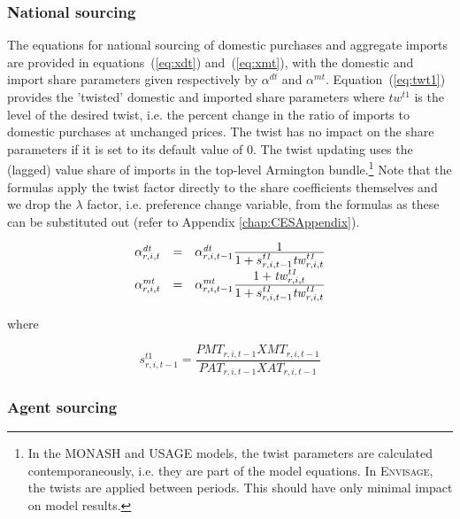 \documentclass[11pt,letterpaper]{report}
\begin{document}
\subsubsection{National sourcing}

The equations for national sourcing of domestic purchases and aggregate imports
are provided in equations~(\ref{eq:xdt}) and~(\ref{eq:xmt}), with the domestic
and import share parameters given respectively by $\alpha^{\mathit{dt}}$ and
$\alpha^{\mathit{mt}}$. Equation~(\ref{eq:twt1}) provides the 'twisted' domestic
and imported share parameters where $\mathit{tw}^{\mathit{t1}}$ is the level of
the desired twist, i.e. the percent change in the ratio of imports to domestic
purchases at unchanged prices. The twist has no impact on the share parameters
if it is set to its default value of 0. The twist updating uses the (lagged)
value share of imports in the top-level Armington bundle.\footnote{In the MONASH
and USAGE models, the twist parameters are calculated contemporaneously, i.e.
they are part of the model equations. In \textsc{Envisage}, the twists are
applied between periods. This should have only minimal impact on model results.}
Note that the formulas apply the twist factor directly to the share coefficients
themselves and we drop the $\lambda$ factor, i.e. preference change variable,
from the formulas as these can be substituted out (refer to
Appendix \ref{chap:CESAppendix}).

\begin{equation}
\label{eq:twt1}
\begin{array}{c c l}
   \alpha^{\mathit{dt}}_{r,i,t} & = &
      \alpha^{\mathit{dt}}_{r,i,t-1}
      \frac {\displaystyle 1} {\displaystyle 1+s^{\mathit{t1}}_{r,i,t-1}
         \mathit{tw}^{\mathit{t1}}_{r,i,t}} \\
   \alpha^{\mathit{mt}}_{r,i,t} & = &
      \alpha^{\mathit{mt}}_{r,i,t-1}
      \frac{\displaystyle 1+\mathit{tw}^{\mathit{t1}}_{r,i,t}}
         {\displaystyle 1+s^{\mathit{t1}}_{r,i,t-1}
            \mathit{tw}^{\mathit{t1}}_{r,i,t}} \\
\end{array}
\end{equation}

\noindent where

\[
s^{\mathit{t1}}_{r,i,t-1} = \frac{\mathit{PMT}_{r,i,t-1}\mathit{XMT}_{r,i,t-1}}
   {\mathit{PAT}_{r,i,t-1}\mathit{XAT}_{r,i,t-1}}
\]

\subsubsection{Agent sourcing}
\end{document}
